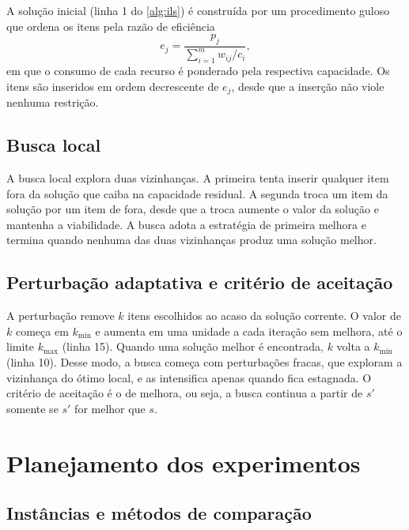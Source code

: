 A solução inicial (linha 1 do \cref{alg:ils}) é construída por um procedimento
guloso que ordena os itens pela razão de eficiência
\begin{equation}
  e_j = \frac{p_j}{\sum_{i=1}^{m} w_{ij} / c_i},
  \label{eq:eficiencia}
\end{equation}
em que o consumo de cada recurso é ponderado pela respectiva capacidade. Os
itens são inseridos em ordem decrescente de $e_j$, desde que a inserção não
viole nenhuma restrição.

\subsection{Busca local}
\label{sec:metodologia:busca}

A busca local explora duas vizinhanças. A primeira tenta inserir qualquer item
fora da solução que caiba na capacidade residual. A segunda troca um item da
solução por um item de fora, desde que a troca aumente o valor da solução e
mantenha a viabilidade. A busca adota a estratégia de primeira melhora e
termina quando nenhuma das duas vizinhanças produz uma solução melhor.

\subsection{Perturbação adaptativa e critério de aceitação}
\label{sec:metodologia:perturbacao}

A perturbação remove $k$ itens escolhidos ao acaso da solução corrente. O valor
de $k$ começa em $k_{\min}$ e aumenta em uma unidade a cada iteração sem
melhora, até o limite $k_{\max}$ (linha 15). Quando uma solução melhor é
encontrada, $k$ volta a $k_{\min}$ (linha 10). Desse modo, a busca começa com
perturbações fracas, que exploram a vizinhança do ótimo local, e as intensifica
apenas quando fica estagnada. O critério de aceitação é o de melhora, ou seja,
a busca continua a partir de $s'$ somente se $s'$ for melhor que $s$.

\section{Planejamento dos experimentos}
\label{sec:metodologia:experimentos}

\subsection{Instâncias e métodos de comparação}

